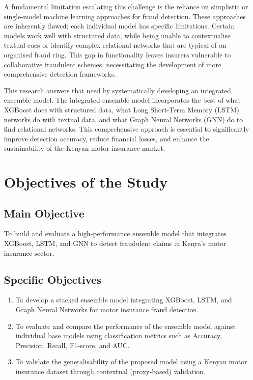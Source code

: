 \documentclass[12pt,a4paper,oneside]{report}
\numberwithin{equation}{chapter}
\begin{document}
A fundamental limitation escalating this challenge is the reliance on simplistic or single-model
machine learning approaches for fraud detection. These approaches are inherently flawed; each
individual model has specific limitations. Certain models work well with structured data, while
being unable to contextualise textual cues or identify complex relational networks that are typical
of an organised fraud ring. This gap in functionality leaves insurers vulnerable to collaborative
fraudulent schemes, necessitating the development of more comprehensive detection frameworks.

This research answers that need by systematically developing an integrated ensemble model. The
integrated ensemble model incorporates the best of what XGBoost does with structured data, what
Long Short-Term Memory (LSTM) networks do with textual data, and what Graph Neural Networks
(GNN) do to find relational networks. This comprehensive approach is essential to significantly
improve detection accuracy, reduce financial losses, and enhance the sustainability of the Kenyan
motor insurance market.
\newpage

\section{Objectives of the Study}

\subsection{Main Objective}
To build and evaluate a high-performance ensemble model that integrates XGBoost, LSTM, and GNN
to detect fraudulent claims in Kenya's motor insurance sector.

\subsection{Specific Objectives}
\begin{enumerate}
    \item To develop a stacked ensemble model integrating XGBoost, LSTM, and Graph Neural Networks for motor insurance fraud detection.
    \item To evaluate and compare the performance of the ensemble model against individual base models using classification metrics such as Accuracy, Precision, Recall, F1-score, and AUC.
    \item To validate the generalisability of the proposed model using a Kenyan motor insurance dataset through contextual (proxy-based) validation.
\end{enumerate}
\end{document}
